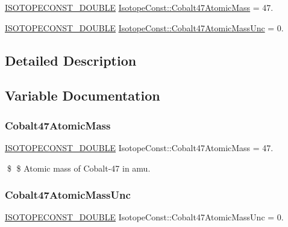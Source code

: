 \begin{DoxyCompactItemize}
\item 
\mbox{\hyperlink{group___isotope_const-_macros_ga8f45a7272ce02c0b4c65c44636ed719a}{I\+S\+O\+T\+O\+P\+E\+C\+O\+N\+S\+T\+\_\+\+D\+O\+U\+B\+LE}} \mbox{\hyperlink{group___isotope_const-_cobalt-_co47_gadc4a03ab46486ae88d92ebda0529ce37}{Isotope\+Const\+::\+Cobalt47\+Atomic\+Mass}} = 47.
\item 
\mbox{\hyperlink{group___isotope_const-_macros_ga8f45a7272ce02c0b4c65c44636ed719a}{I\+S\+O\+T\+O\+P\+E\+C\+O\+N\+S\+T\+\_\+\+D\+O\+U\+B\+LE}} \mbox{\hyperlink{group___isotope_const-_cobalt-_co47_gad98f9ea6278ddface5fc8d7275d42a78}{Isotope\+Const\+::\+Cobalt47\+Atomic\+Mass\+Unc}} = 0.
\end{DoxyCompactItemize}


\subsection{Detailed Description}


\subsection{Variable Documentation}
\mbox{\label{group___isotope_const-_cobalt-_co47_gadc4a03ab46486ae88d92ebda0529ce37}} 
\subsubsection{\texorpdfstring{Cobalt47\+Atomic\+Mass}{Cobalt47AtomicMass}}
{\footnotesize\ttfamily \mbox{\hyperlink{group___isotope_const-_macros_ga8f45a7272ce02c0b4c65c44636ed719a}{I\+S\+O\+T\+O\+P\+E\+C\+O\+N\+S\+T\+\_\+\+D\+O\+U\+B\+LE}} Isotope\+Const\+::\+Cobalt47\+Atomic\+Mass = 47.}

\$ \$ Atomic mass of Cobalt-\/47 in amu. \mbox{\label{group___isotope_const-_cobalt-_co47_gad98f9ea6278ddface5fc8d7275d42a78}} 
\subsubsection{\texorpdfstring{Cobalt47\+Atomic\+Mass\+Unc}{Cobalt47AtomicMassUnc}}
{\footnotesize\ttfamily \mbox{\hyperlink{group___isotope_const-_macros_ga8f45a7272ce02c0b4c65c44636ed719a}{I\+S\+O\+T\+O\+P\+E\+C\+O\+N\+S\+T\+\_\+\+D\+O\+U\+B\+LE}} Isotope\+Const\+::\+Cobalt47\+Atomic\+Mass\+Unc = 0.}

